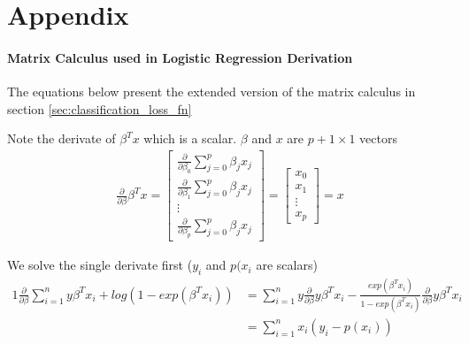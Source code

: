 \documentclass[../statistical_learning_notes.tex]{subfiles}
\begin{document}
\chapter{Appendix}
\subsubsection{Matrix Calculus used in Logistic Regression Derivation}\label{sec:appendix_classification_loss_fn}
The equations below present the extended version of the matrix calculus in section \ref{sec:classification_loss_fn}\newline

Note the derivate of $\beta^{T}x$ which is a scalar. $\beta$ and $x$ are $p+1 \times 1$ vectors
\begin{gather*}
    \frac{\partial}{\partial \beta}\beta^{T}x =     
    \begin{bmatrix}
        \frac{\partial}{\partial \beta_{0}} \sum_{j=0}^{p} \beta_{j}x_{j}\\
        \frac{\partial}{\partial \beta_{1}} \sum_{j=0}^{p} \beta_{j}x_{j}\\
        \vdots\\
        \frac{\partial}{\partial \beta_{p}} \sum_{j=0}^{p} \beta_{j}x_{j}
    \end{bmatrix}
    = 
    \begin{bmatrix}
        x_{0}\\
        x_{1}\\
        \vdots\\
        x_{p}
    \end{bmatrix}
    = x \tag{\theequation}\label{eq:betax_derivative}
\end{gather*}

We solve the single derivate first ($y_{i}$ and $p(x_{i}$ are scalars)
\begin{alignat*}{1}
    \frac{\partial}{\partial \beta}\sum_{i=1}^{n} y\beta^{T}x_{i} + log(1 - exp(\beta^{T}x_{i})) &= \sum_{i=1}^{n} y \frac{\partial}{\partial \beta} y\beta^{T}x_{i} - \frac{exp(\beta^{T}x_{i})}{1 - exp(\beta^{T}x_{i})} \frac{\partial}{\partial \beta} y\beta^{T}x_{i}\\
    &= \sum_{i=1}^{n} x_{i}(y_{i} - p(x_{i}))
\end{alignat*}
\end{document}
